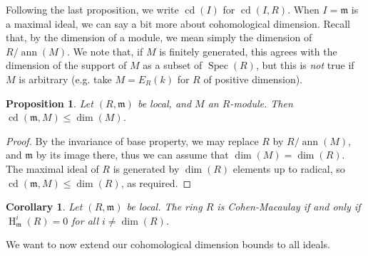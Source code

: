 \documentclass[11pt]{book}
\newtheorem{proposition}[theorem]{Proposition}
\newtheorem{corollary}[theorem]{Corollary}
\numberwithin{equation}{section}
\numberwithin{theorem}{chapter}
\theoremstyle{definition}
\newtheorem*{basic properties}{Basic Properties}
\newtheorem*{Important Remark}{Important Remark}
\theoremstyle{remark}
\newcommand{\m}{\mathfrak{m}}
\newcommand{\Spec}{\operatorname{Spec}}
\newcommand{\ann}{\operatorname{ann}}
\DeclareMathOperator{\cd}{cd}
\renewcommand{\dim}{\operatorname{dim}}
\renewcommand{\H}{\operatorname{H}}
\begin{document}
Following the last proposition, we write $\cd(I)$ for $\cd(I,R)$.\index{$\cd(I)$} When $I=\m$ is a maximal ideal, we can say a bit more about cohomological dimension. Recall that, by the dimension of a module, we mean simply the dimension of $R/\ann(M)$. We note that, if $M$ is finitely generated, this agrees with the dimension of the support of $M$ as a subset of $\Spec(R)$, but this is \emph{not} true if $M$ is arbitrary (e.g. take $M=E_R(k)$ for $R$ of positive dimension).

\begin{proposition}
	Let $(R,\m)$ be local, and $M$ an $R$-module. Then $\cd(\m,M)\leq \dim(M)$.
\end{proposition}
\begin{proof}
	By the invariance of base property, we may replace $R$ by $R/\ann(M)$, and $\m$ by its image there, thus we can assume that $\dim(M)=\dim(R)$. The maximal ideal of $R$ is generated by $\dim(R)$ elements up to radical, so $\cd(\m,M)\leq \dim(R)$, as required.
\end{proof}

\begin{corollary}
	Let $(R,\m)$ be local. The ring $R$ is Cohen-Macaulay if and only if $\H^i_\m(R)= 0$ for all $i\neq \dim(R)$. 
\end{corollary}

We want to now extend our cohomological dimension bounds to all ideals.
\end{document}
